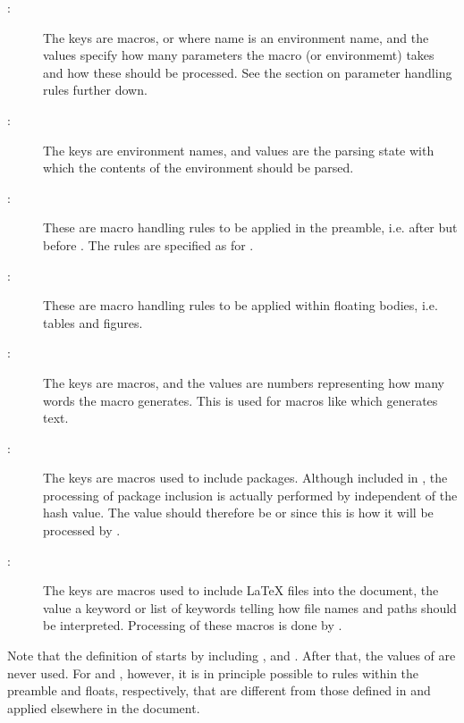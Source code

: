 \documentclass{article}
\begin{document}
\begin{description}

\item[:] The keys are macros, or  where name is an environment name, and the values specify how many parameters the macro (or environmemt) takes and how these should be processed. See the section on parameter handling rules further down.

\item[:] The keys are environment names, and values are the parsing state with which the contents of the environment should be parsed.

\item[:] These are macro handling rules to be applied in the preamble, i.e. after  but before . The rules are specified as for .

\item[:] These are macro handling rules to be applied within floating bodies, i.e. tables and figures.

\item[:] The keys are macros, and the values are numbers representing how many words the macro generates. This is used for macros like  which generates text.

\item[:] The keys are macros used to include packages. Although included in , the processing of package inclusion is actually performed by  independent of the hash value. The value should therefore be  or  since this is how it will be processed by .

\item[:] The keys are macros used to include \LaTeX{} files into the document, the value a keyword or list of keywords telling how file names and paths should be interpreted. Processing of these macros is done by .

\end{description}

Note that the definition of  starts by including ,  and . After that, the values of  are never used. For  and , however, it is in principle possible to rules within the preamble and floats, respectively, that are different from those defined in  and applied elsewhere in the document.
\end{document}
